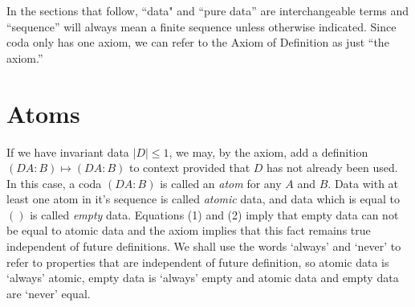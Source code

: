 \documentclass[11pt]{article}
\begin{document}
In the sections that follow, 
``data" and ``pure data'' are interchangeable terms and ``sequence'' will always mean a finite sequence unless otherwise indicated.  Since coda 
only has one axiom, we can refer to the Axiom of Definition as just ``the axiom.'' 

\section{Atoms}

      If we have invariant data $|D|\le 1$, we may, by the axiom, add a definition $(D A:B)\mapsto(D A:B)$ to context provided 
that $D$ has not already been used.  In this case, a coda $(D A:B)$ is called an {\it atom} for any $A$ and $B$.  
Data with at least one atom in it's sequence is called {\it atomic} data, and data which is equal to $()$ is called {\it empty} data. 
Equations (1) and (2) imply that empty data can not be equal to atomic data and the axiom implies that this fact remains 
true independent of future definitions.  We shall use the words `always' and `never' to refer to properties that are independent of 
future definition, so atomic data is `always' atomic, empty data is `always' empty and atomic data and empty data are `never' equal.  
\end{document}
